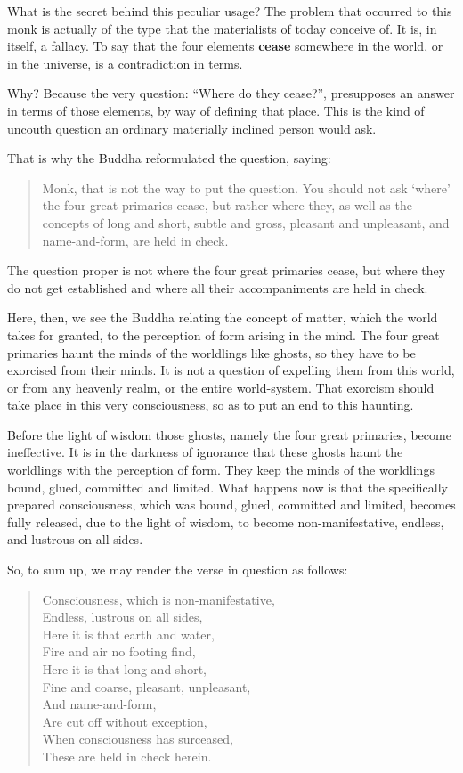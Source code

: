 What is the secret behind this peculiar usage? The problem that occurred to this monk is actually of the type that the materialists of today conceive of. It is, in itself, a fallacy. To say that the four elements \textbf{cease} somewhere in the world, or in the universe, is a contradiction in terms.

Why? Because the very question: ``Where do they cease?'', presupposes an answer in terms of those elements, by way of defining that place. This is the kind of uncouth question an ordinary materially inclined person would ask.

That is why the Buddha reformulated the question, saying:

\begin{quote}
Monk, that is not the way to put the question. You should not ask `where' the four great primaries cease, but rather where they, as well as the concepts of long and short, subtle and gross, pleasant and unpleasant, and name-and-form, are held in check.
\end{quote}

The question proper is not where the four great primaries cease, but where they do not get established and where all their accompaniments are held in check.

Here, then, we see the Buddha relating the concept of matter, which the world takes for granted, to the perception of form arising in the mind. The four great primaries haunt the minds of the worldlings like ghosts, so they have to be exorcised from their minds. It is not a question of expelling them from this world, or from any heavenly realm, or the entire world-system. That exorcism should take place in this very consciousness, so as to put an end to this haunting.

Before the light of wisdom those ghosts, namely the four great primaries, become ineffective. It is in the darkness of ignorance that these ghosts haunt the worldlings with the perception of form. They keep the minds of the worldlings bound, glued, committed and limited. What happens now is that the specifically prepared consciousness, which was bound, glued, committed and limited, becomes fully released, due to the light of wisdom, to become non-manifestative, endless, and lustrous on all sides.

So, to sum up, we may render the verse in question as follows:

\begin{quote}
Consciousness, which is non-manifestative,\\
Endless, lustrous on all sides,\\
Here it is that earth and water,\\
Fire and air no footing find,\\
Here it is that long and short,\\
Fine and coarse, pleasant, unpleasant,\\
And name-and-form,\\
Are cut off without exception,\\
When consciousness has surceased,\\
These are held in check herein.
\end{quote}

